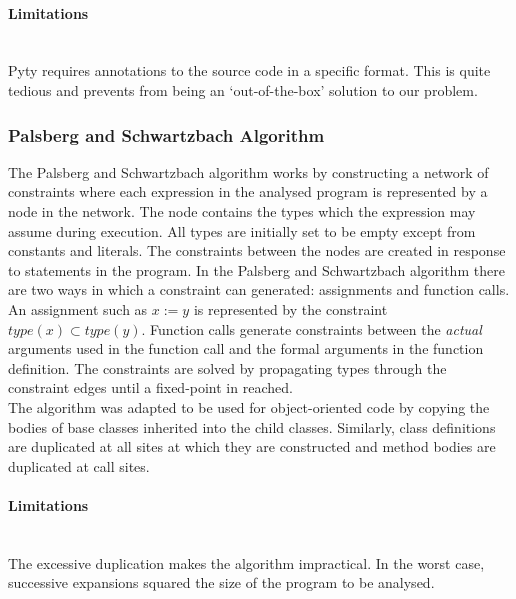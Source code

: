 \documentclass[12pt, titlepage]{article}
\begin{document}
\paragraph{Limitations}\mbox{}\\
Pyty requires annotations to the source code in a specific format. This is quite tedious and prevents from being an `out-of-the-box' solution to our problem.

\subsubsection{Palsberg and Schwartzbach Algorithm}
The Palsberg and Schwartzbach algorithm works by constructing a network of constraints where each expression in the analysed program is represented by a node in the network. The node contains the types which the expression may assume during execution. All types are initially set to be empty except from constants and literals. The constraints between the nodes are created in response to statements in the program. In the Palsberg and Schwartzbach algorithm there are two ways in which a constraint can generated: assignments and function calls. An assignment such as $x := y$ is represented by the constraint $type(x) \subset type(y)$. Function calls generate constraints between the \textit{actual} arguments used in the function call and the formal arguments in the function definition. The constraints are solved by propagating types through the constraint edges until a fixed-point in reached. \\
The algorithm was adapted to be used for object-oriented code by copying the bodies of base classes inherited into the child classes. Similarly, class definitions are duplicated at all sites at which they are constructed and method bodies are duplicated at call sites. \\
\paragraph*{Limitations}\mbox{}\\
The excessive duplication makes the algorithm impractical. In the worst case, successive expansions squared the size of the program to be analysed.
\end{document}
